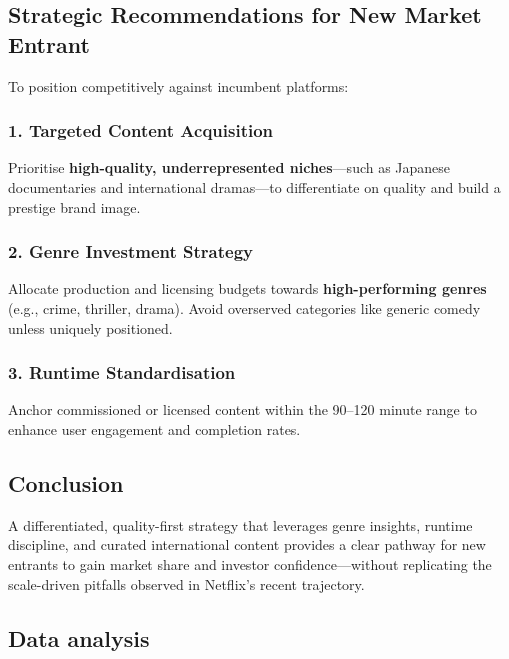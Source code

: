 \documentclass[
  man,floatsintext]{apa6}
\begin{document}
\subsection{Strategic Recommendations for New Market Entrant}\label{strategic-recommendations-for-new-market-entrant}

To position competitively against incumbent platforms:

\subsubsection{1. Targeted Content Acquisition}\label{targeted-content-acquisition}

Prioritise \textbf{high-quality, underrepresented niches}---such as Japanese documentaries and international dramas---to differentiate on quality and build a prestige brand image.

\subsubsection{2. Genre Investment Strategy}\label{genre-investment-strategy}

Allocate production and licensing budgets towards \textbf{high-performing genres} (e.g., crime, thriller, drama). Avoid overserved categories like generic comedy unless uniquely positioned.

\subsubsection{3. Runtime Standardisation}\label{runtime-standardisation}

Anchor commissioned or licensed content within the 90--120 minute range to enhance user engagement and completion rates.

\subsection{Conclusion}\label{conclusion}

A differentiated, quality-first strategy that leverages genre insights, runtime discipline, and curated international content provides a clear pathway for new entrants to gain market share and investor confidence---without replicating the scale-driven pitfalls observed in Netflix's recent trajectory.

\subsection{Data analysis}\label{data-analysis}
\end{document}
